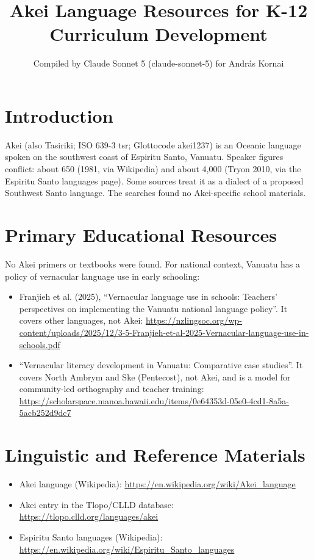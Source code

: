 \documentclass[12pt]{article}
\title{Akei Language Resources for K-12 Curriculum Development}
\author{Compiled by Claude Sonnet 5 (claude-sonnet-5) for Andr\'as Kornai}
\date{}
\begin{document}
\maketitle

\section{Introduction}
Akei (also Tasiriki; ISO 639-3 tsr; Glottocode akei1237) is an Oceanic language spoken on the southwest coast of Espiritu Santo, Vanuatu. Speaker figures conflict: about 650 (1981, via Wikipedia) and about 4,000 (Tryon 2010, via the Espiritu Santo languages page). Some sources treat it as a dialect of a proposed Southwest Santo language. The searches found no Akei-specific school materials.

\section{Primary Educational Resources}
No Akei primers or textbooks were found. For national context, Vanuatu has a policy of vernacular language use in early schooling:
\begin{itemize}
\item Franjieh et al. (2025), ``Vernacular language use in schools: Teachers' perspectives on implementing the Vanuatu national language policy''. It covers other languages, not Akei: \url{https://nzlingsoc.org/wp-content/uploads/2025/12/3-5-Franjieh-et-al-2025-Vernacular-language-use-in-schools.pdf}
\item ``Vernacular literacy development in Vanuatu: Comparative case studies''. It covers North Ambrym and Ske (Pentecost), not Akei, and is a model for community-led orthography and teacher training: \url{https://scholarspace.manoa.hawaii.edu/items/0e64353d-05e0-4cd1-8a5a-5acb252d9dc7}
\end{itemize}

\section{Linguistic and Reference Materials}
\begin{itemize}
\item Akei language (Wikipedia): \url{https://en.wikipedia.org/wiki/Akei_language}
\item Akei entry in the Tlopo/CLLD database: \url{https://tlopo.clld.org/languages/akei}
\item Espiritu Santo languages (Wikipedia): \url{https://en.wikipedia.org/wiki/Espiritu_Santo_languages}
\end{itemize}
\end{document}
